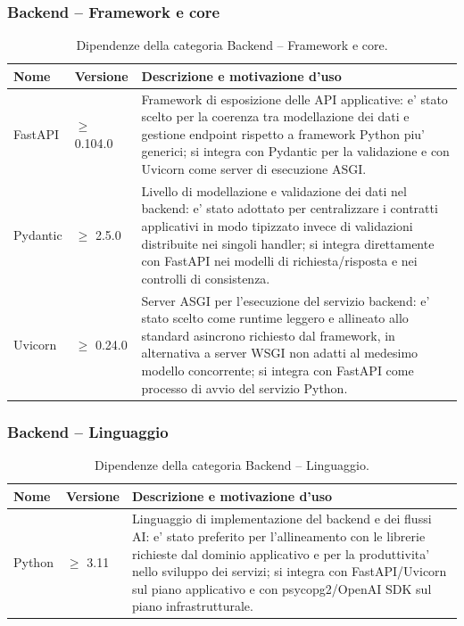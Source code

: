 \documentclass[a4paper, 11pt, oneside]{scrartcl}
\begin{document}
\subsubsection{Backend -- Framework e core}
\begin{table}[H]
    \centering
    \renewcommand{\arraystretch}{1.2}
    \begin{tabularx}{\textwidth}{@{}l l X@{}}
        \toprule
        \textbf{Nome} & \textbf{Versione} & \textbf{Descrizione e motivazione d'uso} \\
        \midrule
        FastAPI & $\geq$ 0.104.0 & Framework di esposizione delle API applicative: e' stato scelto per la coerenza tra modellazione dei dati e gestione endpoint rispetto a framework Python piu' generici; si integra con Pydantic per la validazione e con Uvicorn come server di esecuzione ASGI. \\
        Pydantic & $\geq$ 2.5.0 & Livello di modellazione e validazione dei dati nel backend: e' stato adottato per centralizzare i contratti applicativi in modo tipizzato invece di validazioni distribuite nei singoli handler; si integra direttamente con FastAPI nei modelli di richiesta/risposta e nei controlli di consistenza. \\
        Uvicorn & $\geq$ 0.24.0 & Server ASGI per l'esecuzione del servizio backend: e' stato scelto come runtime leggero e allineato allo standard asincrono richiesto dal framework, in alternativa a server WSGI non adatti al medesimo modello concorrente; si integra con FastAPI come processo di avvio del servizio Python. \\
        \bottomrule
    \end{tabularx}
    \caption{Dipendenze della categoria Backend -- Framework e core.}
    \label{tab:dip_backend_framework_core}
\end{table}

\subsubsection{Backend -- Linguaggio}
\begin{table}[H]
    \centering
    \renewcommand{\arraystretch}{1.2}
    \begin{tabularx}{\textwidth}{@{}l l X@{}}
        \toprule
        \textbf{Nome} & \textbf{Versione} & \textbf{Descrizione e motivazione d'uso} \\
        \midrule
        Python & $\geq$ 3.11 & Linguaggio di implementazione del backend e dei flussi AI: e' stato preferito per l'allineamento con le librerie richieste dal dominio applicativo e per la produttivita' nello sviluppo dei servizi; si integra con FastAPI/Uvicorn sul piano applicativo e con psycopg2/OpenAI SDK sul piano infrastrutturale. \\
        \bottomrule
    \end{tabularx}
    \caption{Dipendenze della categoria Backend -- Linguaggio.}
    \label{tab:dip_backend_linguaggio}
\end{table}
\end{document}

